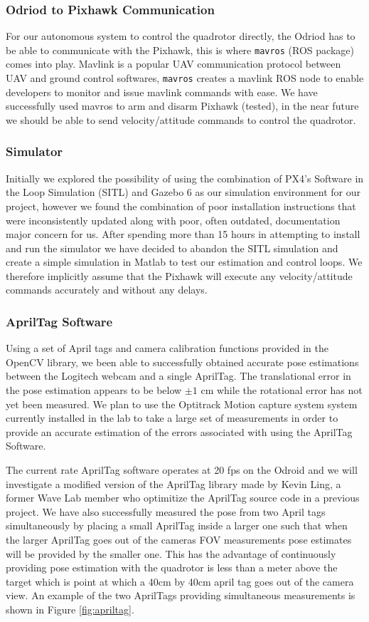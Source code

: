 \documentclass{article}[12pt]
\begin{document}
\subsubsection*{Odriod to Pixhawk Communication}
For our autonomous system to control the quadrotor directly, the Odriod has to 
be able to communicate with the Pixhawk, this is where \verb|mavros| (ROS 
package) comes into play. Mavlink is a popular UAV communication protocol 
between UAV and ground control softwares, \verb|mavros| creates a mavlink ROS 
node to enable developers to monitor and issue mavlink commands with ease. We 
have successfully used mavros to arm and disarm Pixhawk (tested), in the near 
future we should be able to send velocity/attitude commands to control the 
quadrotor.

\subsubsection*{Simulator}
Initially we explored the possibility of using the combination of PX4's 
Software in the Loop Simulation (SITL) and Gazebo 6 as our simulation 
environment for our project, however we found the combination of poor installation instructions that were inconsistently updated along with poor, often outdated, documentation major concern for us. After spending more than 15 hours in attempting to install and run the simulator we have decided to abandon the SITL simulation and create a simple simulation in Matlab to test our estimation and control loops. We therefore implicitly assume that the Pixhawk will execute any velocity/attitude commands accurately and without any delays. 

\subsubsection*{AprilTag Software}
Using a set of April tags and camera calibration functions provided in the OpenCV library, we been able to successfully obtained accurate pose estimations between the Logitech webcam and a single AprilTag. The translational error in the pose estimation appears to be below $\pm 1$ cm while the rotational error has not yet been measured. We plan to use the Optitrack Motion capture system system currently installed in the lab to take a large set of measurements in order to provide an accurate estimation of the errors associated with using the AprilTag Software. 

The current rate AprilTag software operates at 20 fps on the Odroid and we will investigate a modified version of the AprilTag library made by Kevin Ling, a former Wave Lab member who optimitize the AprilTag source code in a previous project. We have also successfully measured the pose from two April tags simultaneously by placing a small AprilTag inside a larger one such that when the larger AprilTag goes out of the cameras FOV measurements pose estimates will be provided by the smaller one. This has the advantage of continuously providing pose estimation with the quadrotor is less than a meter above the target which is point at which a 40cm by 40cm april tag goes out of the camera view. An example of the two AprilTags providing simultaneous measurements is shown in Figure \ref{fig:apriltag}.
\end{document}
